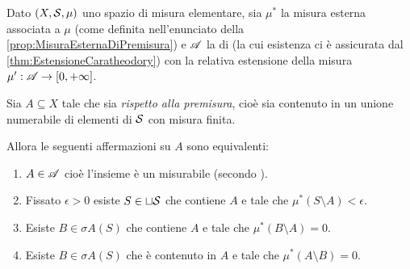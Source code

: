 \begin{theorem}\label{thm:EquivalenzeMisurabilitaSottoinsieme}
	Dato $(X,\S,\mu)$ uno spazio di misura elementare, sia $\mu^*$ la misura esterna associata a $\mu$ (come definita nell'enunciato della \cref{prop:MisuraEsternaDiPremisura}) e $\A$ la \sigalg{} di \carat{} (la cui esistenza ci è assicurata dal \cref{thm:EstensioneCaratheodory}) con la relativa estensione della misura $\mu':\A\to\Rpiu$.
	
	Sia $A\subseteq X$ tale che sia \emph{\sigfin[o] rispetto alla premisura}, cioè sia contenuto in un unione numerabile di elementi di $\S$ con misura finita.
	
	Allora le seguenti affermazioni su $A$ sono equivalenti:
	\begin{enumerate}[label=(\arabic*),ref=(\arabic*)]
		\item $A\in\A$ cioè l'insieme è un misurabile (secondo \carat{}).\label{it:MisurabileEquivalenze}
		\item Fissato $\epsilon>0$ esiste $S\in\sqcup\S$ che contiene $A$ e tale che $\mu^*(S\setminus A)<\epsilon$.\label{it:UnioniDaFuoriEquivalenze}
		\item Esiste $B\in\sigma A(S)$ che contiene $A$ e tale che $\mu^*(B\setminus A)=0$.\label{it:SigmaDaFuoriEquivalenze}
		\item Esiste $B\in\sigma A(S)$ che è contenuto in $A$ e tale che $\mu^*(A\setminus B)=0$.\label{it:SigmaDaDentroEquivalenze}
	\end{enumerate}
\end{theorem}
\newcommand{\ImplicationProof}[2]{$\text{\ref{#1}}\implies\text{\ref{#2}}$}%
